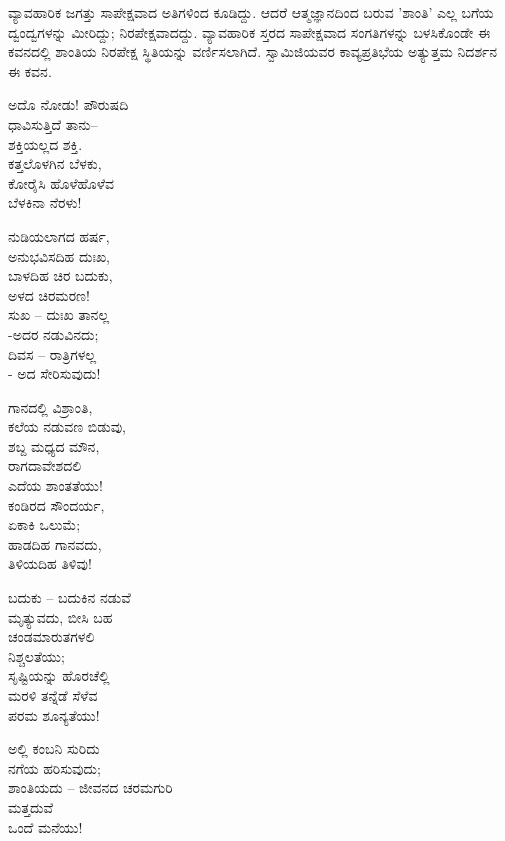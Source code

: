 ವ್ಯಾವಹಾರಿಕ ಜಗತ್ತು ಸಾಪೇಕ್ಷವಾದ ಅತಿಗಳಿಂದ ಕೂಡಿದ್ದು. ಆದರೆ ಆತ್ಮಜ್ಞಾನದಿಂದ ಬರುವ 'ಶಾಂತಿ' ಎಲ್ಲ ಬಗೆಯ ದ್ವಂದ್ವಗಳನ್ನು ಮೀರಿದ್ದು; ನಿರಪೇಕ್ಷವಾದದ್ದು. ವ್ಯಾವಹಾರಿಕ ಸ್ತರದ ಸಾಪೇಕ್ಷವಾದ ಸಂಗತಿಗಳನ್ನು ಬಳಸಿಕೊಂಡೇ ಈ ಕವನದಲ್ಲಿ ಶಾಂತಿಯ ನಿರಪೇಕ್ಷ ಸ್ಥಿತಿಯನ್ನು ವರ್ಣಿಸಲಾಗಿದೆ. ಸ್ವಾಮಿಜಿಯವರ ಕಾವ್ಯಪ್ರತಿಭೆಯ ಅತ್ಯುತ್ತಮ ನಿದರ್ಶನ ಈ ಕವನ.

\begin{myquote}
ಅದೊ ನೋಡು! ಪೌರುಷದಿ\\ಧಾವಿಸುತ್ತಿದೆ ತಾನು–\\ಶಕ್ತಿಯಲ್ಲದ ಶಕ್ತಿ.\\ಕತ್ತಲೊಳಗಿನ ಬೆಳಕು,\\ಕೋರೈಸಿ ಹೊಳೆಹೊಳೆವ\\ಬೆಳಕಿನಾ ನೆರಳು!
\end{myquote}

\begin{myquote}
ನುಡಿಯಲಾಗದ ಹರ್ಷ,\\ಅನುಭವಿಸದಿಹ ದುಃಖ,\\ಬಾಳದಿಹ ಚಿರ ಬದುಕು,\\ಅಳದ ಚಿರಮರಣ!\\ಸುಖ – ದುಃಖ ತಾನಲ್ಲ\\-ಅದರ ನಡುವಿನದು;\\ದಿವಸ – ರಾತ್ರಿಗಳಲ್ಲ\\- ಅದ ಸೇರಿಸುವುದು!
\end{myquote}

\begin{myquote}
ಗಾನದಲ್ಲಿ ವಿಶ್ರಾಂತಿ,\\ಕಲೆಯ ನಡುವಣ ಬಿಡುವು,\\ಶಬ್ದ ಮಧ್ಯದ ಮೌನ,\\ರಾಗದಾವೇಶದಲಿ\\ಎದೆಯ ಶಾಂತತೆಯು!\\ಕಂಡಿರದ ಸೌಂದರ್ಯ,\\ಏಕಾಕಿ ಒಲುಮೆ;\\ಹಾಡದಿಹ ಗಾನವದು,\\ತಿಳಿಯದಿಹ ತಿಳಿವು!
\end{myquote}

\begin{myquote}
ಬದುಕು – ಬದುಕಿನ ನಡುವೆ\\ಮೃತ್ಯುವದು, ಬೀಸಿ ಬಹ\\ಚಂಡಮಾರುತಗಳಲಿ\\ನಿಶ್ಚಲತೆಯು;\\ಸೃಷ್ಟಿಯನ್ನು ಹೊರಚೆಲ್ಲಿ\\ಮರಳಿ ತನ್ನೆಡೆ ಸೆಳೆವ\\ಪರಮ ಶೂನ್ಯತೆಯು!
\end{myquote}

\begin{myquote}
ಅಲ್ಲಿ ಕಂಬನಿ ಸುರಿದು\\ನಗೆಯ ಹರಿಸುವುದು;\\ಶಾಂತಿಯದು – ಜೀವನದ ಚರಮಗುರಿ\\ಮತ್ತದುವೆ\\ಒಂದೆ ಮನೆಯು!
\end{myquote}

